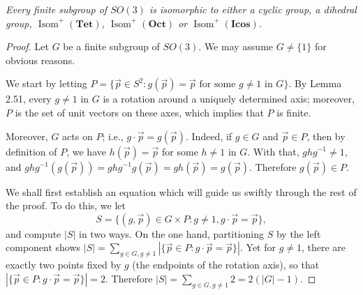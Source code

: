 \documentclass[leqno]{book}
\begin{document}
\emph{Every finite subgroup of $SO(3)$ is isomorphic to either a cyclic group, a dihedral group, $\operatorname{Isom}^+(\mathbf{Tet})$, $\operatorname{Isom}^+(\mathbf{Oct})$ or $\operatorname{Isom}^+(\mathbf{Icos})$.}
\begin{proof} %
Let $G$ be a finite subgroup of $SO(3)$.  We may assume $G\ne\{1\}$ for obvious reasons.

We start by letting $P=\{\vec p\in S^2:g(\vec p)=\vec p\text{ for some }g\ne 1\text{ in }G\}$.  By Lemma 2.51, every $g\ne 1$ in $G$ is a rotation around a uniquely determined axis; moreover, $P$ is the set of unit vectors on these axes, which implies that $P$ is finite.

Moreover, $G$ acts on $P$; i.e., $g\cdot\vec p=g(\vec p)$.  Indeed, if $g\in G$ and $\vec p\in P$, then by definition of $P$, we have $h(\vec p)=\vec p$ for some $h\ne 1$ in $G$.  With that, $ghg^{-1}\ne 1$, and $ghg^{-1}(g(\vec p))=ghg^{-1}g(\vec p)=gh(\vec p)=g(\vec p)$.  Therefore $g(\vec p)\in P$.

We shall first establish an equation which will guide us swiftly through the rest of the proof.  To do this, we let
$$S=\{(g,\vec p)\in G\times P:g\ne 1,g\cdot\vec p=\vec p\},$$
and compute $|S|$ in two ways.  On the one hand, partitioning $S$ by the left component shows $|S|=\sum_{g\in G,g\ne 1}|\{\vec p\in P:g\cdot\vec p=\vec p\}|$.  Yet for $g\ne 1$, there are exactly two points fixed by $g$ (the endpoints of the rotation axis), so that $|\{\vec p\in P:g\cdot\vec p=\vec p\}|=2$.  Therefore $|S|=\sum_{g\in G,g\ne 1}2=2(|G|-1)$.


\end{proof}
\end{document}
